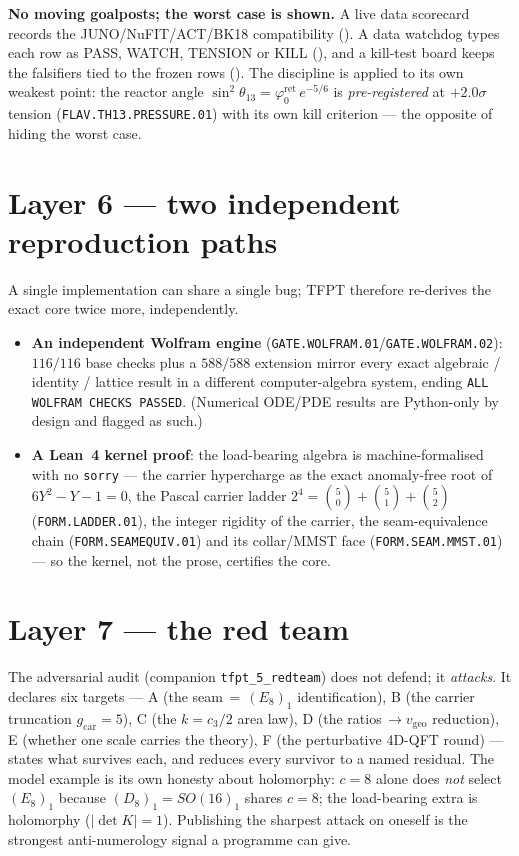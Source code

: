 \documentclass[11pt,a4paper]{article}
\newcommand{\phiz}{\varphi_0^{\mathrm{ret}}}
\newcommand{\gcar}{g_{\mathrm{car}}}
\begin{document}
\par\smallskip\noindent\textbf{No moving goalposts; the worst case is shown.} A live data scorecard records
the JUNO/NuFIT/ACT/BK18 compatibility (). A data watchdog types each row
as PASS, WATCH, TENSION or KILL (), and a kill-test board keeps the falsifiers
tied to the frozen rows (). The discipline is applied to its own weakest
point: the reactor angle $\sin^2\theta_{13}=\phiz\,e^{-5/6}$ is \emph{pre-registered} at $+2.0\sigma$ tension
(\texttt{FLAV.TH13.PRESSURE.01}) with its own kill criterion --- the opposite of hiding the worst case.

\section{Layer 6 --- two independent reproduction paths}
A single implementation can share a single bug; TFPT therefore re-derives the exact core twice more,
independently.
\begin{itemize}
\item \textbf{An independent Wolfram engine} (\texttt{GATE.WOLFRAM.01}/\texttt{GATE.WOLFRAM.02}):
$116/116$ base checks plus a $588/588$ extension mirror every exact algebraic / identity / lattice result
in a different computer-algebra system, ending \texttt{ALL WOLFRAM CHECKS PASSED}. (Numerical ODE/PDE
results are Python-only by design and flagged as such.)
\item \textbf{A Lean~4 kernel proof}: the load-bearing algebra is machine-formalised with no \texttt{sorry}
--- the carrier hypercharge as the exact anomaly-free root of $6Y^2{-}Y{-}1=0$, the Pascal carrier
ladder $2^4=\binom50{+}\binom51{+}\binom52$ (\texttt{FORM.LADDER.01}), the integer rigidity of the carrier,
the seam-equivalence chain (\texttt{FORM.SEAMEQUIV.01}) and its collar/MMST face
(\texttt{FORM.SEAM.MMST.01}) --- so the kernel, not the prose, certifies the core.
\end{itemize}

\section{Layer 7 --- the red team}
The adversarial audit (companion \texttt{tfpt\_5\_redteam}) does not defend; it \emph{attacks}. It declares
six targets --- A (the seam$\,=\,(E_8)_1$ identification), B (the carrier truncation $\gcar{=}5$), C (the
$k{=}c_3/2$ area law), D (the ratios$\,\to v_{\mathrm{geo}}$ reduction), E (whether one scale carries the
theory), F (the perturbative 4D-QFT round) --- states what survives each, and reduces every survivor to a
named residual. The model
example is its own honesty about holomorphy: $c=8$ alone does \emph{not} select $(E_8)_1$ because
$(D_8)_1=SO(16)_1$ shares $c=8$; the load-bearing extra is holomorphy ($|\!\det K|=1$). Publishing the
sharpest attack on oneself is the strongest anti-numerology signal a programme can give.
\end{document}
